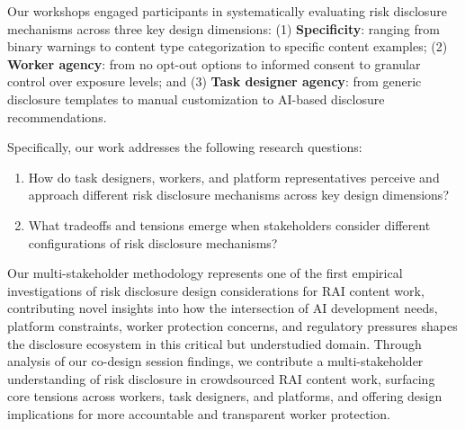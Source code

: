 Our workshops engaged participants in systematically evaluating risk disclosure mechanisms across three key design dimensions: (1) \textbf{Specificity}: ranging from binary warnings to content type categorization to specific content examples; (2) \textbf{Worker agency}: from no opt-out options to informed consent to granular control over exposure levels; and (3) \textbf{Task designer agency}: from generic disclosure templates to manual customization to AI-based disclosure recommendations. 




Specifically, our work addresses the following research questions:
\begin{enumerate}
  \item How do task designers, workers, and platform representatives perceive and approach different risk disclosure mechanisms across key design dimensions? 
  \item What tradeoffs and tensions emerge when stakeholders consider different configurations of risk disclosure mechanisms? 
\end{enumerate}
Our multi-stakeholder methodology represents one of the first empirical investigations of risk disclosure design considerations for RAI content work, contributing novel insights into how the intersection of AI development needs, platform constraints, worker protection concerns, and regulatory pressures shapes the disclosure ecosystem in this critical but understudied domain. Through analysis of our co-design session findings, we contribute a multi-stakeholder understanding of risk disclosure in crowdsourced RAI content work, surfacing core tensions across workers, task designers, and platforms, and offering design implications for more accountable and transparent worker protection.


